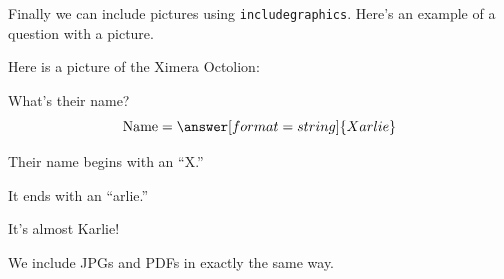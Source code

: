 \documentclass{ximera}
\begin{document}
Finally we can include pictures using \verb|includegraphics|. Here's an example of a question with a picture.
\begin{question}
    Here is a picture of the Ximera Octolion:
    \begin{center}
    \end{center}
    What's their name?
    \[
    \text{Name} = \answer[format=string]{Xarlie}
    \]
    \begin{hint}
        Their name begins with an ``X.''
    \end{hint}
    \begin{hint}
        It ends with an ``arlie.''
    \end{hint}
    \begin{hint}
        It's almost Karlie!
    \end{hint}
\end{question}

We include JPGs and PDFs in exactly the same way.
\end{document}
